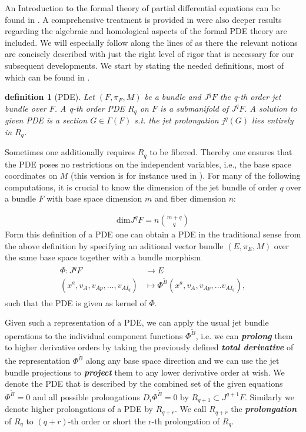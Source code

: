 \documentclass[a4paper,12pt, DIV=14, BCOR=5mm, twoside, headsepline, numbers=noenddot]{scrbook}
\newtheorem{definition}{definition}[section]
\begin{document}
An Introduction to the formal theory of partial differential equations can be found in \cite{saunders_1989}. A comprehensive treatment is provided in \cite{seiler2009involution} were also deeper results regarding the algebraic and homological aspects of the formal PDE theory are included. We will especially follow along the lines of \cite{seiler1994analysis} as there the relevant notions are concisely described with just the right level of rigor that is necessary for our subsequent developments. We start by stating the needed definitions, most of which can be found in \cite{seiler1994analysis}.
\begin{definition}[PDE]
Let $(F,\pi_F,M)$ be a bundle and $J^qF$ the q-th order jet bundle over $F$. A q-th order PDE $R_q$ on $F$ is a  submanifold of $J^qF$. A solution to given PDE is a section $G \in \Gamma(F)$ s.t. the jet prolongation $j^q(G)$ lies entirely in $R_q$.  
\end{definition}
Sometimes one additionally requires $R_q$ to be fibered. Thereby one ensures that the PDE poses no restrictions on the independent variables, i.e., the base space coordinates on $M$ (this version is for instance used in \cite{seiler1994analysis}).
For many of the following computations, it is crucial to know the dimension of the jet bundle of order $q$ over a bundle $F$ with base space dimension $m$ and fiber dimension $n$:

\begin{align}
    \mathrm{dim}J^qF = n\binom{m+q}{q}
\end{align}
Form this definition of a PDE one can obtain a PDE in the traditional sense from the above definition by specifying an aditional vector bundle $(E,\pi_E,M)$ over the same base space together with a bundle morphism
\begin{align}
    \begin{aligned}
    \Phi : J^qF &\longrightarrow E\\
    (x^a, v_A, v_{Ap},...,v_{AI_q}) &\longmapsto \Phi^{\tilde{B}}(x^a, v_A, v_{Ap},...v_{AI_q}),
    \end{aligned}
\end{align}
such that the PDE is given as kernel of $\Phi$. 

Given such a representation of a PDE, we can apply the usual jet bundle operations to the individual component functions $\Phi^{\tilde{B}}$, i.e. we can \textit{\textbf{prolong}} them to higher derivative orders by taking the previously defined \textit{\textbf{total derivative}} of the representation $\Phi^{\tilde{B}}$ along any base space direction and we can use the jet bundle projections to \textit{\textbf{project}} them to any lower derivative order at wish. We denote the PDE that is described by the combined set of the given equations $\Phi^{\tilde{B}}=0$ and all possible prolongations $D_i\Phi^{\tilde{B}}=0$ by $R_{q+1} \subset J^{q+1}F$. Similarly we denote higher prolongations of a PDE by $R_{q+r}$. We call $R_{q+r}$ the \textit{\textbf{prolongation}} of $R_q$ to $(q+r)$-th order or short the r-th prolongation of $R_q$. 
\end{document}
